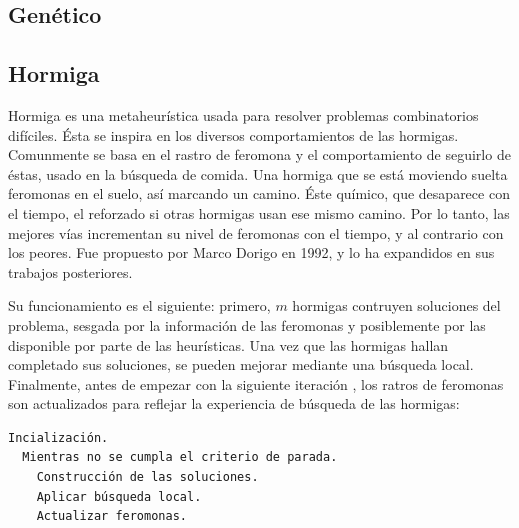 \cite{SwAjAm2008}

\subsection{Gen\'etico}

\subsection{Hormiga}

Hormiga es una metaheurística usada para resolver problemas combinatorios
difíciles. \'Esta se inspira en los diversos comportamientos de las hormigas.
Comunmente se basa en el rastro de feromona y el comportamiento de seguirlo 
de éstas, usado en la búsqueda de comida. Una hormiga que se est\'a moviendo 
suelta feromonas en el suelo, as\'i marcando un camino. \'Este químico, que 
desaparece con el tiempo, el reforzado si otras hormigas usan ese mismo camino.
Por lo tanto, las mejores v\'ias incrementan su nivel de feromonas con el tiempo, 
y al contrario con los peores. Fue propuesto por Marco Dorigo en 1992, 
y lo ha expandidos en sus trabajos posteriores.
\cite{GePo2010} \cite{Le2007}

Su funcionamiento es el siguiente: primero, $m$ hormigas contruyen
soluciones del problema, sesgada por la informaci\'on de las feromonas y posiblemente
por las disponible por parte de las heur\'isticas. Una vez que las hormigas hallan completado
sus soluciones, se pueden mejorar mediante una b\'usqueda local. Finalmente,
antes de empezar con la siguiente iteraci\'on , los ratros de feromonas son
actualizados para reflejar la experiencia de b\'usqueda de las hormigas:

\begin{lstlisting}[mathescape, language=Pascal]
  Incialización.
  Mientras no se cumpla el criterio de parada.
    Construcción de las soluciones.
    Aplicar búsqueda local.
    Actualizar feromonas.
\end{lstlisting}

